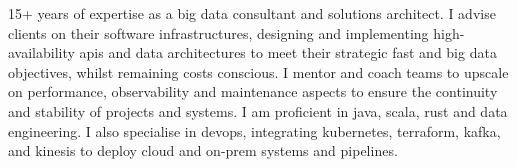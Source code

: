 

\begin{cvparagraph}

15+ years of expertise as a big data consultant and solutions architect.
I advise clients on their software infrastructures, designing and implementing high-availability apis and data architectures to meet their strategic fast and big data objectives, whilst remaining costs conscious.
I mentor and coach teams to upscale on performance, observability and maintenance aspects to ensure the continuity and stability of projects and systems.
I am proficient in java, scala, rust and data engineering.
I also specialise in devops, integrating kubernetes, terraform, kafka, and kinesis to deploy cloud and on-prem systems and pipelines.
\end{cvparagraph}
